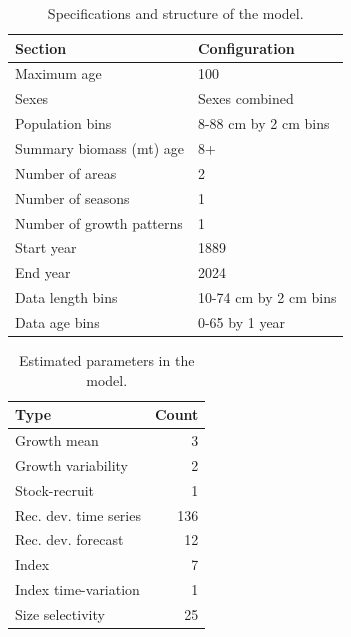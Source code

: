 \documentclass[
]{scrartcl}
\begin{document}
\begin{longtable}{ll}

\caption{\label{tbl-model-config}Specifications and structure of the
model.}

\tabularnewline

\toprule
Section & Configuration \\ 
\midrule\addlinespace[2.5pt]
Maximum age & 100 \\ 
Sexes & Sexes combined \\ 
Population bins & 8-88 cm by 2 cm bins \\ 
Summary biomass (mt) age & 8+ \\ 
Number of areas & 2 \\ 
Number of seasons & 1 \\ 
Number of growth patterns & 1 \\ 
Start year & 1889 \\ 
End year & 2024 \\ 
Data length bins & 10-74 cm by 2 cm bins \\ 
Data age bins & 0-65 by 1 year \\ 
\bottomrule

\end{longtable}

\endgroup

\newpage{}

\begingroup
\fontsize{9.0pt}{10.8pt}\selectfont

\begin{longtable}{lr}

\caption{\label{tbl-n-param}Estimated parameters in the model.}

\tabularnewline

\toprule
Type & Count \\ 
\midrule\addlinespace[2.5pt]
Growth mean & 3 \\ 
Growth variability & 2 \\ 
Stock-recruit & 1 \\ 
Rec. dev. time series & 136 \\ 
Rec. dev. forecast & 12 \\ 
Index & 7 \\ 
Index time-variation & 1 \\ 
Size selectivity & 25 \\ 
\bottomrule

\end{longtable}

\endgroup

\newpage{}
\end{document}
